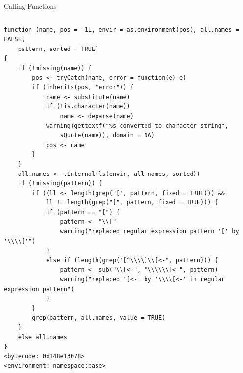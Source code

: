 \documentclass[
  11pt,
  ignorenonframetext,
]{beamer}
\begin{document}
\begin{frame}[fragile]{Calling Functions}
\begin{columns}[T,onlytextwidth]
\begin{column}{0.48\textwidth}
\begin{verbatim}
function (name, pos = -1L, envir = as.environment(pos), all.names = FALSE, 
    pattern, sorted = TRUE) 
{
    if (!missing(name)) {
        pos <- tryCatch(name, error = function(e) e)
        if (inherits(pos, "error")) {
            name <- substitute(name)
            if (!is.character(name)) 
                name <- deparse(name)
            warning(gettextf("%s converted to character string", 
                sQuote(name)), domain = NA)
            pos <- name
        }
    }
    all.names <- .Internal(ls(envir, all.names, sorted))
    if (!missing(pattern)) {
        if ((ll <- length(grep("[", pattern, fixed = TRUE))) && 
            ll != length(grep("]", pattern, fixed = TRUE))) {
            if (pattern == "[") {
                pattern <- "\\["
                warning("replaced regular expression pattern '[' by  '\\\\['")
            }
            else if (length(grep("[^\\\\]\\[<-", pattern))) {
                pattern <- sub("\\[<-", "\\\\\\[<-", pattern)
                warning("replaced '[<-' by '\\\\[<-' in regular expression pattern")
            }
        }
        grep(pattern, all.names, value = TRUE)
    }
    else all.names
}
<bytecode: 0x148e13078>
<environment: namespace:base>
\end{verbatim}
\end{column}
\end{columns}
\end{frame}
\end{document}
